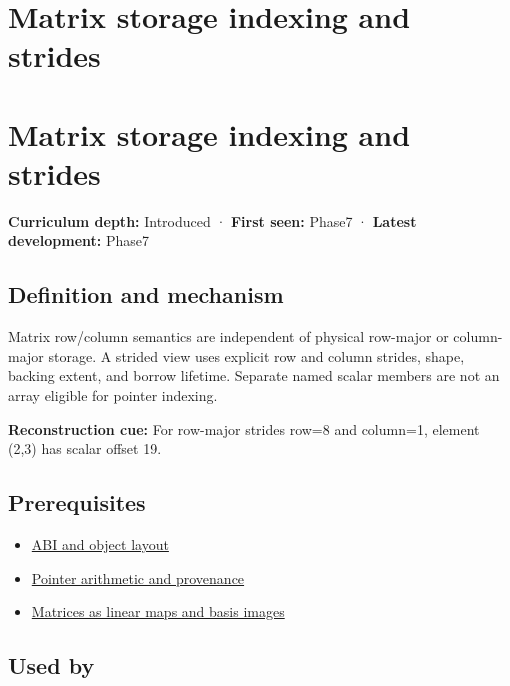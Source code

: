 \hypertarget{appendix-ffdc1d4e5350}{}
\section*{Matrix storage indexing and strides}
\section{Matrix storage indexing and strides}\label{appendix-ffdc1d4e5350-matrix-storage-indexing-and-strides}

\textbf{Curriculum depth:} Introduced · \textbf{First seen:} Phase7 · \textbf{Latest development:} Phase7

\subsection{Definition and mechanism}\label{appendix-ffdc1d4e5350-definition-and-mechanism}

Matrix row/column semantics are independent of physical row-major or column-major storage. A strided view uses explicit row and column strides, shape, backing extent, and borrow lifetime. Separate named scalar members are not an array eligible for pointer indexing.

\textbf{Reconstruction cue:} For row-major strides row=8 and column=1, element (2,3) has scalar offset 19.

\subsection{Prerequisites}\label{appendix-ffdc1d4e5350-prerequisites}

\begin{itemize}
\tightlist
\item
  \hyperref[appendix-c4ac6bb0fff8]{ABI and object layout}
\item
  \hyperref[appendix-6af5921bc853]{Pointer arithmetic and provenance}
\item
  \hyperref[appendix-bd39c3bf5d64]{Matrices as linear maps and basis images}
\end{itemize}

\subsection{Used by}\label{appendix-ffdc1d4e5350-used-by}

